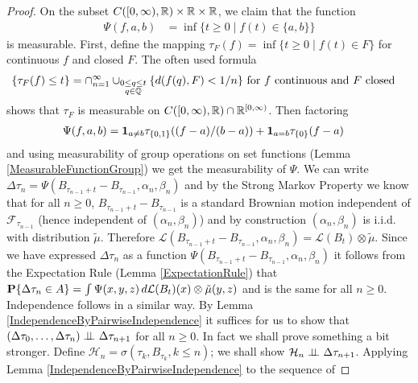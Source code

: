 \begin{proof}
On the subset $C([0,\infty), \mathbb{R}) \times \mathbb{R} \times \mathbb{R}$, we claim that the function
\begin{align*}
\Psi (f, a, b) &= \inf \lbrace t \geq 0 \mid f(t) \in \lbrace a, b
\rbrace \rbrace
\end{align*}
is measurable.  First, define the mapping $\tau_F(f) = \inf \lbrace t \geq 0 \mid f(t)
\in F\rbrace$ for continuous $f$ and closed $F$.  The often used formula 
\begin{align*}
\lbrace \tau_F(f) \leq t \rbrace &= \cap_{n=1}^\infty
\cup_{\substack{0 \leq q \leq t \\ q \in \mathbb{Q}}} \lbrace d(f(q),
F) < 1/n\rbrace \text{ for $f$ continuous and $F$ closed} 
\end{align*}
shows that $\tau_F$ is measurable on $C([0,\infty), \mathbb{R}) \cap
\mathbb{R}^{[0,\infty)}$.  
Then factoring 
\begin{align*}
\Psi (f, a, b) &= \textbf{1}_{a\neq b} \tau_{\lbrace 0,1
  \rbrace}((f-a)/(b-a)) + \textbf{1}_{a = b} \tau_{\lbrace 0
  \rbrace}(f-a)
\end{align*}
and using measurability of group operations on set functions (Lemma
\ref{MeasurableFunctionGroup}) we get the measurability of $\Psi$.
We can write $\Delta \tau_n = \Psi(B_{\tau_{n-1}+t} - B_{\tau_{n-1}}, \alpha_n,
  \beta_n)$ and by the Strong Markov Property we know that for all $n
  \geq 0$, $B_{\tau_{n-1}+t} - B_{\tau_{n-1}}$ is a standard Brownian
  motion independent of $\mathcal{F}_{\tau_{n-1}}$ (hence independent
  of $(\alpha_n, \beta_n)$) and by construction $(\alpha_n, \beta_n)$ is i.i.d. with
  distribution $\tilde{\mu}$.  Therefore
  $\mathcal{L}(B_{\tau_{n-1}+t} - B_{\tau_{n-1}}, \alpha_n,  \beta_n)
  = \mathcal{L}(B_t) \otimes \tilde{\mu}$.  Since we have expressed
  $\Delta \tau_n$ as a function $ \Psi(B_{\tau_{n-1}+t} - B_{\tau_{n-1}}, \alpha_n,
  \beta_n)$ it follows from the Expectation Rule (Lemma
  \ref{ExpectationRule}) that $\textbf{P}\{ \Delta \tau_n \in A\} =
  \int \Psi(x,y,z) \, d \mathcal{L}(B_t)(x) \otimes \tilde{\mu}(y,z)$ and is the same for all $n \geq 0$.
Independence follows in a similar way.  By Lemma
\ref{IndependenceByPairwiseIndependence} it suffices for us to show
that $(\Delta \tau_0, \dotsc, \Delta \tau_{n})  \perp \! \! \! \perp_{} \Delta
  \tau_{n+1}$ for all $n\geq 0$.  In fact we shall prove something
a bit stronger.  Define $\mathcal{H}_n = \sigma(\tau_k, B_{\tau_k},
k\leq n)$; we shall show $\mathcal{H}_n \perp \! \! \! \perp_{} \Delta
  \tau_{n+1}$.  Applying Lemma
\ref{IndependenceByPairwiseIndependence} to the sequence of

\end{proof}
